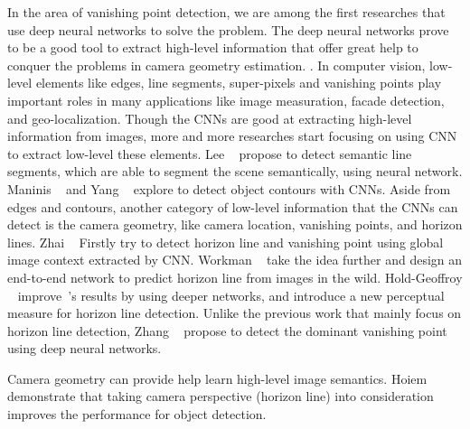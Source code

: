 In the area of vanishing point detection, we are among the first
researches that use deep neural networks to solve the problem. The
deep neural networks prove to be a good tool to extract high-level
information that offer great help to conquer the problems in camera
geometry estimation. .
%
\newline \newline
%
In computer vision, low-level elements like edges, line segments,
super-pixels and vanishing points play important roles in many
applications like image measuration, facade detection, and
geo-localization.
Though the CNNs are good at extracting high-level information from
images, more and more researches start focusing on using CNN to
extract low-level these elements.
%
Lee \etal~\cite{lee2017semantic} propose to detect semantic line
segments, which are able to segment the scene semantically, using
neural network. Maninis \etal~\cite{maninis2016convolutional} and Yang
\etal~\cite{yang2016object} explore to detect object contours with
CNNs.
%
Aside from edges and contours, another category of low-level
information that the CNNs can detect is the camera geometry, like
camera location, vanishing points, and horizon lines.
Zhai \etal~\cite{zhai2016horizon} Firstly try to detect horizon
line and vanishing point using global image context extracted by CNN.
Workman \etal~\cite{workman2016horizon} take the idea further and
design an end-to-end network to predict horizon line from images
in the wild. 
Hold-Geoffroy \etal~\cite{hold2017perceptual}
improve~\cite{workman2016horizon}'s results by using deeper networks,
and introduce a new perceptual measure for horizon line detection.
Unlike the previous work that mainly focus on horizon line detection,
Zhang \etal~\cite{zhang2018dominant} propose to detect the dominant
vanishing point using deep neural networks.

Camera geometry can provide help learn high-level image semantics.
Hoiem \etal~\cite{hoiem2008putting} demonstrate that taking camera
perspective (horizon line) into consideration improves the performance
for object detection.


